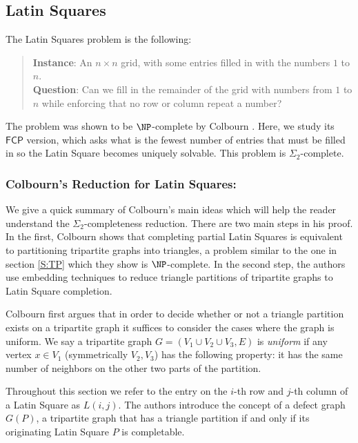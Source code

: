 \documentclass[runningheads,a4paper]{llncs}
\begin{document}
\subsection{Latin Squares}

The Latin Squares problem is the following:
\begin{quote}
\textbf{Instance}: An $n \times n$ grid, with some entries filled in with the numbers $1$ to $n$.\\
\textbf{Question}: Can we fill in the remainder of the grid with numbers from $1$ to $n$ while enforcing that no row or column repeat a number?
\end{quote}
The problem was shown to be $\NP$-complete by Colbourn \cite{colbourn1984complexity}. Here, we study its  $\mathsf{FCP}$ version, which asks what is the fewest number of entries that must be filled in so the Latin Square becomes uniquely solvable. This problem is $\Sigma_2$-complete. 

\subsubsection{Colbourn's Reduction for Latin Squares:}
We give a quick summary of Colbourn's main ideas which will help the reader understand the $\Sigma_2$-completeness reduction. There are two main steps in his proof. In the first, Colbourn shows that completing partial Latin Squares is equivalent to partitioning tripartite graphs into triangles, a problem similar to the one in section \ref{S:TP} which they show is $\NP$-complete. In the second step, the authors use embedding techniques to reduce triangle partitions of tripartite graphs to Latin Square completion. 

Colbourn \cite{colbourn1984complexity} first argues that in order to decide whether or not a triangle partition exists on a tripartite graph it suffices to consider the cases where the graph is uniform. We say a tripartite graph $G = (V_1 \cup V_2 \cup V_3, E)$ is \emph{uniform} if any vertex $x \in V_1$ (symmetrically $V_2, V_3$) has the following property: it has the same number of neighbors on the other two parts of the partition. 

Throughout this section we refer to the entry on the $i$-th row and $j$-th column of a Latin Square as $L(i,j)$. The authors introduce the concept of a defect graph $G(P)$, a tripartite graph that has a triangle partition if and only if its originating Latin Square $P$ is completable. 
\end{document}
